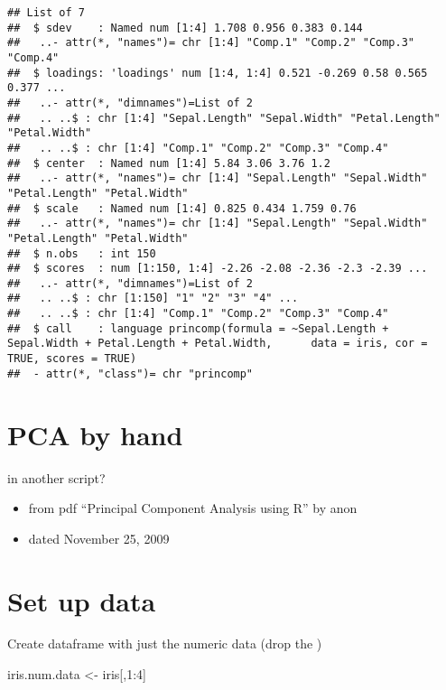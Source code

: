 \documentclass[
]{book}
\newenvironment{Shaded}{\begin{snugshade}}{\end{snugshade}}
\newcommand{\DecValTok}[1]{\textcolor[rgb]{0.00,0.00,0.81}{#1}}
\newcommand{\NormalTok}[1]{#1}
\newcommand{\OtherTok}[1]{\textcolor[rgb]{0.56,0.35,0.01}{#1}}
\newcommand{\SpecialCharTok}[1]{\textcolor[rgb]{0.00,0.00,0.00}{#1}}
\providecommand{\tightlist}{%
  \setlength{\itemsep}{0pt}\setlength{\parskip}{0pt}}
\begin{document}
\begin{verbatim}
## List of 7
##  $ sdev    : Named num [1:4] 1.708 0.956 0.383 0.144
##   ..- attr(*, "names")= chr [1:4] "Comp.1" "Comp.2" "Comp.3" "Comp.4"
##  $ loadings: 'loadings' num [1:4, 1:4] 0.521 -0.269 0.58 0.565 0.377 ...
##   ..- attr(*, "dimnames")=List of 2
##   .. ..$ : chr [1:4] "Sepal.Length" "Sepal.Width" "Petal.Length" "Petal.Width"
##   .. ..$ : chr [1:4] "Comp.1" "Comp.2" "Comp.3" "Comp.4"
##  $ center  : Named num [1:4] 5.84 3.06 3.76 1.2
##   ..- attr(*, "names")= chr [1:4] "Sepal.Length" "Sepal.Width" "Petal.Length" "Petal.Width"
##  $ scale   : Named num [1:4] 0.825 0.434 1.759 0.76
##   ..- attr(*, "names")= chr [1:4] "Sepal.Length" "Sepal.Width" "Petal.Length" "Petal.Width"
##  $ n.obs   : int 150
##  $ scores  : num [1:150, 1:4] -2.26 -2.08 -2.36 -2.3 -2.39 ...
##   ..- attr(*, "dimnames")=List of 2
##   .. ..$ : chr [1:150] "1" "2" "3" "4" ...
##   .. ..$ : chr [1:4] "Comp.1" "Comp.2" "Comp.3" "Comp.4"
##  $ call    : language princomp(formula = ~Sepal.Length + Sepal.Width + Petal.Length + Petal.Width,      data = iris, cor = TRUE, scores = TRUE)
##  - attr(*, "class")= chr "princomp"
\end{verbatim}

\hypertarget{pca-by-hand}{%
\section{PCA by hand}\label{pca-by-hand}}

in another script?

\begin{itemize}
\tightlist
\item
  from pdf ``Principal Component Analysis using R'' by anon
\item
  dated November 25, 2009
\end{itemize}

\hypertarget{set-up-data}{%
\section{Set up data}\label{set-up-data}}

Create dataframe with just the numeric data (drop the )

\begin{Shaded}
\begin{Highlighting}[]
\NormalTok{iris.num.data }\OtherTok{\textless{}{-}}\NormalTok{ iris[,}\DecValTok{1}\SpecialCharTok{:}\DecValTok{4}\NormalTok{]}
\end{Highlighting}
\end{Shaded}
\end{document}
